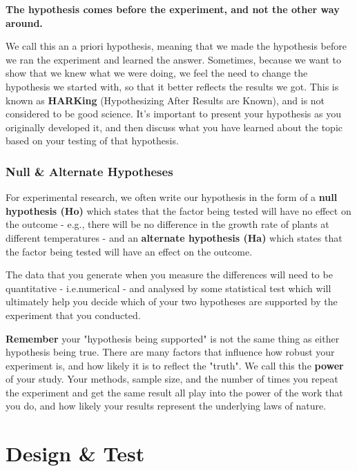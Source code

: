 \documentclass[
]{book}
\begin{document}
\textbf{The hypothesis comes before the experiment, and not the other way around.}

We call this an a priori hypothesis, meaning that we made the hypothesis before we ran the experiment and learned the answer. Sometimes, because we want to show that we knew what we were doing, we feel the need to change the hypothesis we started with, so that it better reflects the results we got. This is known as \textbf{HARKing} (Hypothesizing After Results are Known), and is not considered to be good science. It's important to present your hypothesis as you originally developed it, and then discuss what you have learned about the topic based on your testing of that hypothesis.

\hypertarget{null-alternate-hypotheses}{%
\subsubsection*{Null \& Alternate Hypotheses}\label{null-alternate-hypotheses}}

For experimental research, we often write our hypothesis in the form of a \textbf{null hypothesis (Ho)} which states that the factor being tested will have no effect on the outcome - e.g., there will be no difference in the growth rate of plants at different temperatures - and an \textbf{alternate hypothesis (Ha)} which states that the factor being tested will have an effect on the outcome.

The data that you generate when you measure the differences will need to be quantitative - i.e.numerical - and analysed by some statistical test which will ultimately help you decide which of your two hypotheses are supported by the experiment that you conducted.

\textbf{Remember} your "hypothesis being supported" is not the same thing as either hypothesis being true. There are many factors that influence how robust your experiment is, and how likely it is to reflect the "truth". We call this the \textbf{power} of your study. Your methods, sample size, and the number of times you repeat the experiment and get the same result all play into the power of the work that you do, and how likely your results represent the underlying laws of nature.

\hypertarget{design-test}{%
\section*{Design \& Test}\label{design-test}}
\end{document}
